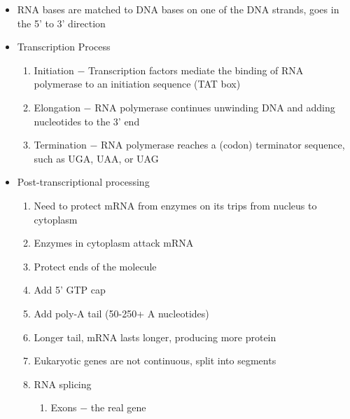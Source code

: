 \documentclass[12pt]{article}
\begin{document}
\begin{itemize}
\item RNA bases are matched to DNA bases on one of the DNA strands, goes in the 5' to 3' direction

\item Transcription Process

  \begin{enumerate}

    \item Initiation $-$ Transcription factors mediate the binding of RNA polymerase to an initiation sequence (TAT box)

    \item Elongation $-$ RNA polymerase continues unwinding DNA and adding nucleotides to the 3' end

    \item Termination $-$ RNA polymerase reaches a (codon) terminator sequence, such as UGA, UAA, or UAG

  \end{enumerate}

\item Post-transcriptional processing

  \begin{enumerate}

    \item Need to protect mRNA from enzymes on its trips from nucleus to cytoplasm

    \item Enzymes in cytoplasm attack mRNA

    \item Protect ends of the molecule

    \item Add 5' GTP cap

    \item Add poly-A tail (50-250+ A nucleotides)

    \item Longer tail, mRNA lasts longer, producing more protein

    \item Eukaryotic genes are not continuous, split into segments

    \item RNA splicing

      \begin{enumerate}

        \item Exons $-$ the real gene

          \begin{enumerate}


\end{enumerate}
\end{enumerate}
\end{enumerate}
\end{itemize}
\end{document}
